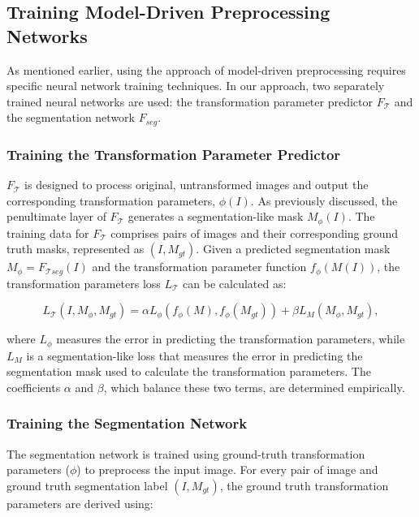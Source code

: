 \subsection{Training Model-Driven Preprocessing Networks}

As mentioned earlier, using the approach of model-driven preprocessing requires specific neural network training techniques. In our approach, two separately trained neural networks are used: the transformation parameter predictor $F_{\mathcal{T}}$ and the segmentation network $F_{seg}$. 

\subsubsection{Training the Transformation Parameter Predictor}

\(F_{\mathcal{T}}\) is designed to process original, untransformed images and output the corresponding transformation parameters, \( \phi(I) \). As previously discussed, the penultimate layer of \(F_{\mathcal{T}}\) generates a segmentation-like mask \( M_\phi(I) \). The training data for \(F_{\mathcal{T}}\) comprises pairs of images and their corresponding ground truth masks, represented as \((I, M_{gt})\). Given a predicted segmentation mask $M_\phi = F_{\mathcal{T}seg}(I)$ and the transformation parameter function $f_\phi(M(I))$, the transformation parameters loss $L_\mathcal{T}$ can be calculated as:

\begin{equation}
	L_\mathcal{T}(I, M_\phi, M_{gt}) = \alpha L_\phi(f_\phi(M), f_\phi(M_{gt})) + \beta L_{M}(M_\phi, M_{gt}),
\end{equation}

where $L_\phi$ measures the error in predicting the transformation parameters, while $L_{M}$ is a segmentation-like loss that measures the error in predicting the segmentation mask used to calculate the transformation parameters. The coefficients \(\alpha\) and \(\beta\), which balance these two terms, are determined empirically.

\subsubsection{Training the Segmentation Network}

The segmentation network is trained using ground-truth transformation parameters (\(\phi\)) to preprocess the input image. For every pair of image and ground truth segmentation label \((I, M_{gt})\), the ground truth transformation parameters are derived using:

